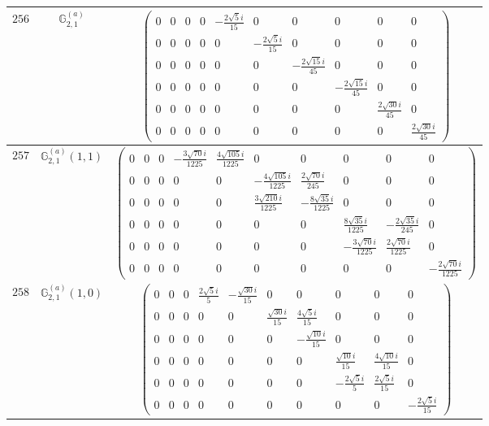 \documentclass[fleqn,8pt,landscape]{jsarticle}
\begin{document}
\begin{center}
\begin{longtable}{ccc}
$ 256 $ & $ \mathbb{G}_{2,1}^{(a)} $ & $ \begin{pmatrix} 0 & 0 & 0 & 0 & - \frac{2 \sqrt{5} i}{15} & 0 & 0 & 0 & 0 & 0 \\ 0 & 0 & 0 & 0 & 0 & - \frac{2 \sqrt{5} i}{15} & 0 & 0 & 0 & 0 \\ 0 & 0 & 0 & 0 & 0 & 0 & - \frac{2 \sqrt{15} i}{45} & 0 & 0 & 0 \\ 0 & 0 & 0 & 0 & 0 & 0 & 0 & - \frac{2 \sqrt{15} i}{45} & 0 & 0 \\ 0 & 0 & 0 & 0 & 0 & 0 & 0 & 0 & \frac{2 \sqrt{30} i}{45} & 0 \\ 0 & 0 & 0 & 0 & 0 & 0 & 0 & 0 & 0 & \frac{2 \sqrt{30} i}{45} \end{pmatrix} $ \\ \hline
$ 257 $ & $ \mathbb{G}_{2,1}^{(a)}(1,1) $ & $ \begin{pmatrix} 0 & 0 & 0 & - \frac{3 \sqrt{70} i}{1225} & \frac{4 \sqrt{105} i}{1225} & 0 & 0 & 0 & 0 & 0 \\ 0 & 0 & 0 & 0 & 0 & - \frac{4 \sqrt{105} i}{1225} & \frac{2 \sqrt{70} i}{245} & 0 & 0 & 0 \\ 0 & 0 & 0 & 0 & 0 & \frac{3 \sqrt{210} i}{1225} & - \frac{8 \sqrt{35} i}{1225} & 0 & 0 & 0 \\ 0 & 0 & 0 & 0 & 0 & 0 & 0 & \frac{8 \sqrt{35} i}{1225} & - \frac{2 \sqrt{35} i}{245} & 0 \\ 0 & 0 & 0 & 0 & 0 & 0 & 0 & - \frac{3 \sqrt{70} i}{1225} & \frac{2 \sqrt{70} i}{1225} & 0 \\ 0 & 0 & 0 & 0 & 0 & 0 & 0 & 0 & 0 & - \frac{2 \sqrt{70} i}{1225} \end{pmatrix} $ \\ \hline
$ 258 $ & $ \mathbb{G}_{2,1}^{(a)}(1,0) $ & $ \begin{pmatrix} 0 & 0 & 0 & \frac{2 \sqrt{5} i}{5} & - \frac{\sqrt{30} i}{15} & 0 & 0 & 0 & 0 & 0 \\ 0 & 0 & 0 & 0 & 0 & \frac{\sqrt{30} i}{15} & \frac{4 \sqrt{5} i}{15} & 0 & 0 & 0 \\ 0 & 0 & 0 & 0 & 0 & 0 & - \frac{\sqrt{10} i}{15} & 0 & 0 & 0 \\ 0 & 0 & 0 & 0 & 0 & 0 & 0 & \frac{\sqrt{10} i}{15} & \frac{4 \sqrt{10} i}{15} & 0 \\ 0 & 0 & 0 & 0 & 0 & 0 & 0 & - \frac{2 \sqrt{5} i}{5} & \frac{2 \sqrt{5} i}{15} & 0 \\ 0 & 0 & 0 & 0 & 0 & 0 & 0 & 0 & 0 & - \frac{2 \sqrt{5} i}{15} \end{pmatrix} $ \\ \hline

\end{longtable}
\end{center}
\end{document}
